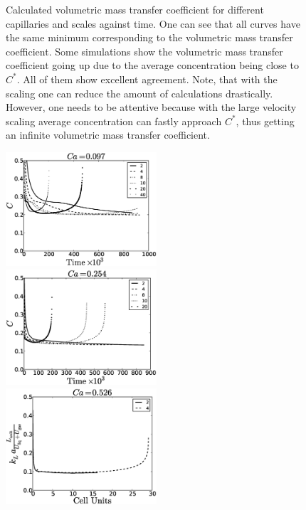 \documentclass{article}
\newcommand{\cstar}{C^{*}}
\begin{document}
\begin{figure}[htb!]
\caption{Calculated volumetric mass transfer coefficient for different capillaries and scales
against time. One can see
that all curves have the same minimum corresponding to the volumetric mass transfer coefficient.
Some simulations show the volumetric mass transfer coefficient going up due to the average
concentration being close to $\cstar$. All of them show excellent agreement. Note, that with the
scaling one can reduce the amount of calculations drastically. However, one needs to be attentive
because with the large velocity scaling average concentration can fastly approach $\cstar$, thus
getting an infinite volumetric mass transfer coefficient.
\label{fig:aver:conc:different:capillaries:time}}
\end{figure}
\begin{figure}[htb!]
\includegraphics[width=0.5\textwidth]{Figures/aver_conc_scale_ca097.eps}
\includegraphics[width=0.5\textwidth]{Figures/aver_conc_scale_ca054.eps}\\
\includegraphics[width=0.5\textwidth]{Figures/aver_conc_scale_ca026.eps}

\end{figure}
\end{document}

